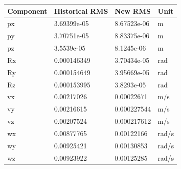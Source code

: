 \begin{tabular}{llll}
\hline
Component & Historical RMS & New RMS & Unit \\
\hline
px & 3.69399e-05 & 8.67523e-06 & m \\
py & 3.70751e-05 & 8.83375e-06 & m \\
pz & 3.5539e-05 & 8.1245e-06 & m \\
Rx & 0.000146349 & 3.70434e-05 & rad \\
Ry & 0.000154649 & 3.95669e-05 & rad \\
Rz & 0.000153995 & 3.8293e-05 & rad \\
vx & 0.00217026 & 0.00022671 & m/s \\
vy & 0.00216615 & 0.000227544 & m/s \\
vz & 0.00207524 & 0.000217612 & m/s \\
wx & 0.00877765 & 0.00122166 & rad/s \\
wy & 0.00925421 & 0.00130853 & rad/s \\
wz & 0.00923922 & 0.00125285 & rad/s \\
\hline
\end{tabular}
